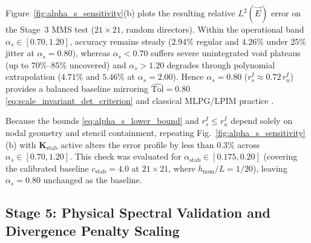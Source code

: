\documentclass[VANCOUVER]{USG}
\begin{document}
Figure~\ref{fig:alpha_s_sensitivity}(b) plots the resulting relative $L^2(\vec{E})$ error on the Stage~3 MMS test ($21 \times 21$, random directors). Within the operational band $\alpha_s \in [0.70, 1.20]$, accuracy remains steady ($2.94\%$ regular and $4.26\%$ under $25\%$ jitter at $\alpha_s = 0.80$), whereas $\alpha_s < 0.70$ suffers severe unintegrated void plateaus (up to $70\%\text{--}85\%$ uncovered) and $\alpha_s > 1.20$ degrades through polynomial extrapolation ($4.71\%$ and $5.46\%$ at $\alpha_s = 2.00$). Hence $\alpha_s = 0.80$ ($r_s^I \approx 0.72\,r_u^I$) provides a balanced baseline mirroring $\widehat{\mathrm{Tol}} = 0.80$ \eqref{eq:scale_invariant_det_criterion} and classical MLPG/LPIM practice \cite{atluri2002meshless, liu2009mesh}.

\begin{remark}
    Because the bounds \eqref{eq:alpha_s_lower_bound} and $r_s^I \le r_u^I$ depend solely on nodal geometry and stencil containment, repeating Fig.~\ref{fig:alpha_s_sensitivity}(b) with $\mathbf{K}_{\mathrm{stab}}$ active alters the error profile by less than $0.3\%$ across $\alpha_s \in [0.70, 1.20]$. This check was evaluated for $\alpha_{\mathrm{stab}} \in [0.175, 0.20]$ (covering the calibrated baseline $c_{\mathrm{stab}} = 4.0$ at $21\times 21$, where $h_{\mathrm{nom}}/L = 1/20$), leaving $\alpha_s = 0.80$ unchanged as the baseline.
\end{remark}

\subsection{Stage 5: Physical Spectral Validation and Divergence Penalty Scaling}
\label{subsec:stage5_cavity}
\end{document}
